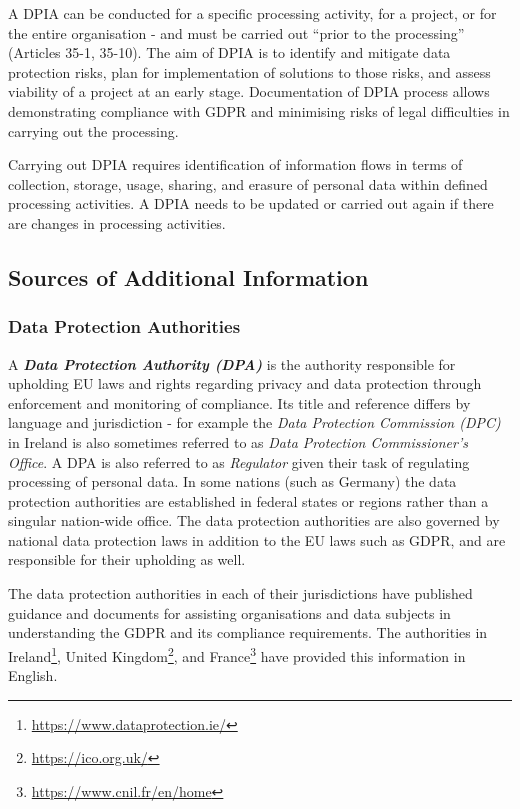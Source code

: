 A DPIA can be conducted for a specific processing activity, for a project, or for the entire organisation - and must be carried out ``prior to the processing'' (Articles 35-1, 35-10).
The aim of DPIA is to identify and mitigate data protection risks, plan for implementation of solutions to those risks, and assess viability of a project at an early stage.
Documentation of DPIA process allows demonstrating compliance with GDPR and minimising risks of legal difficulties in carrying out the processing.

Carrying out DPIA requires identification of information flows in terms of collection, storage, usage, sharing, and erasure of personal data within defined processing activities. A DPIA needs to be updated or carried out again if there are changes in processing activities.

\subsection{Sources of Additional Information}

\subsubsection{Data Protection Authorities}
A \textit{\textbf{Data Protection Authority (DPA)}} is the authority responsible for upholding EU laws and rights regarding privacy and data protection through enforcement and monitoring of compliance.
Its title and reference differs by language and jurisdiction - for example the \textit{Data Protection Commission (DPC)} in Ireland is also sometimes referred to as \textit{Data Protection Commissioner's Office}. 
A DPA is also referred to as \textit{Regulator} given their task of regulating processing of personal data.
In some nations (such as Germany) the data protection authorities are established in federal states or regions rather than a singular nation-wide office. The data protection authorities are also governed by national data protection laws in addition to the EU laws such as GDPR, and are responsible for their upholding as well.

The data protection authorities in each of their jurisdictions have published guidance and documents for assisting organisations and data subjects in understanding the GDPR and its compliance requirements. The authorities in Ireland\footnote{\url{https://www.dataprotection.ie/}}, United Kingdom\footnote{\url{https://ico.org.uk/}}, and France\footnote{\url{https://www.cnil.fr/en/home}} have provided this information in English.

